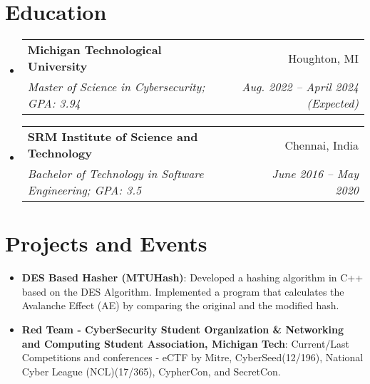 \documentclass[a4paper,10pt]{article}
\makeatletter
\newcommand{\resumeItem}[2]{
  \item\small{
    \textbf{#1}{: #2 \vspace{-2pt}}
  }
}
\newcommand{\resumeSubheading}[4]{
  \vspace{-1pt}\item
    \begin{tabular*}{0.97\textwidth}[t]{l@{\extracolsep{\fill}}r}
      \textbf{#1} & #2 \\
      \textit{\small#3} & \textit{\small #4} \\
    \end{tabular*}\vspace{-5pt}
}
\newcommand{\resumeSubItem}[2]{\resumeItem{#1}{#2}\vspace{-4pt}}
\newcommand{\resumeSubHeadingListStart}{\begin{itemize}[leftmargin=*]}
\newcommand{\resumeSubHeadingListEnd}{\end{itemize}}
\makeatother
\begin{document}
\section{Education}
  \resumeSubHeadingListStart
    \resumeSubheading
      {Michigan Technological University}{Houghton, MI}
      {Master of Science in Cybersecurity; GPA: 3.94}{Aug. 2022 -- April 2024 (Expected)}
    \resumeSubheading
      {SRM Institute of Science and Technology}{Chennai, India}
      {Bachelor of Technology in Software Engineering; GPA: 3.5}{June 2016 -- May 2020}
  \resumeSubHeadingListEnd
  
\section{Projects and Events}
  \resumeSubHeadingListStart
    \resumeSubItem{DES Based Hasher (MTUHash)}

      {Developed a hashing algorithm in C++ based on the DES Algorithm. Implemented a program that calculates the Avalanche Effect (AE) by comparing the original and the modified hash.}
    \resumeSubItem{Red Team - CyberSecurity Student Organization \& Networking and Computing Student Association, Michigan Tech}
      {Current/Last Competitions and conferences - eCTF by Mitre, CyberSeed(12/196), National Cyber League (NCL)(17/365), CypherCon, and SecretCon.}
  \resumeSubHeadingListEnd

\end{document}

